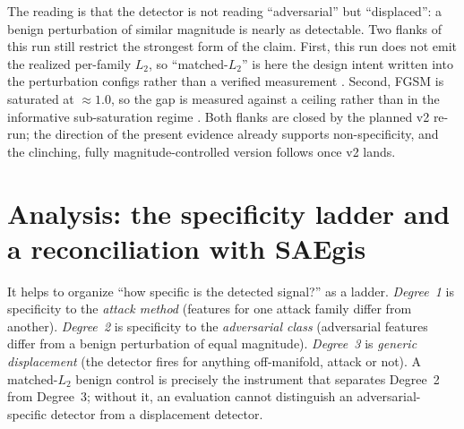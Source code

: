 \documentclass[../ppgc-tese.tex]{subfiles}
\begin{document}
The reading is that the detector is not reading ``adversarial'' but ``displaced'': a
benign perturbation of similar magnitude is nearly as detectable. Two flanks of this
run still restrict the strongest form of the claim. First, this run does not emit the
realized per-family $L_2$, so ``matched-$L_2$'' is here the design intent written
into the perturbation configs rather than a verified measurement
. Second, FGSM is saturated at $\approx1.0$, so the gap is measured against a
ceiling rather than in the informative sub-saturation regime
. Both flanks are closed by the planned v2 re-run; the direction of the
present evidence already supports non-specificity, and the clinching, fully
magnitude-controlled version follows once v2 lands.

\section{Analysis: the specificity ladder and a reconciliation with SAEgis}
\label{sec:adv-analysis}
It helps to organize ``how specific is the detected signal?'' as a ladder.
\emph{Degree~1} is specificity to the \emph{attack method} (features for one attack
family differ from another). \emph{Degree~2} is specificity to the \emph{adversarial
class} (adversarial features differ from a benign perturbation of equal magnitude).
\emph{Degree~3} is \emph{generic displacement} (the detector fires for anything
off-manifold, attack or not). A matched-$L_2$ benign control is precisely the
instrument that separates Degree~2 from Degree~3; without it, an evaluation cannot
distinguish an adversarial-specific detector from a displacement detector.
\end{document}
